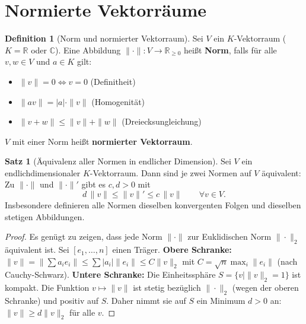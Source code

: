 ﻿\documentclass[a4paper,12pt]{report}
\theoremstyle{definition}
\newtheorem{definition}{Definition}
\newtheorem{satz}{Satz}
\begin{document}
\section{Normierte Vektorräume}

\begin{definition}[Norm und normierter Vektorraum]
    Sei $V$ ein $K$-Vektorraum ($K = \mathbb{R}$ oder $\mathbb{C}$).
    Eine Abbildung $\|\cdot\| : V \to \mathbb{R}_{\geq 0}$ heißt
    \textbf{Norm}, falls für alle $v, w \in V$ und $a \in K$ gilt:
    \begin{itemize}
        \item[-] $\|v\| = 0 \Leftrightarrow v = 0$ \quad (Definitheit)
        \item[-] $\|av\| = |a| \cdot \|v\|$ \quad (Homogenität)
        \item[-] $\|v + w\| \leq \|v\| + \|w\|$ \quad (Dreiecksungleichung)
    \end{itemize}
    $V$ mit einer Norm heißt \textbf{normierter Vektorraum}.
\end{definition}

\begin{satz}[Äquivalenz aller Normen in endlicher Dimension]
    Sei $V$ ein endlichdimensionaler $K$-Vektorraum. Dann sind je zwei
    Normen auf $V$ äquivalent: Zu $\|\cdot\|$ und $\|\cdot\|'$
    gibt es $c, d > 0$ mit
    \[
        d\, \|v\| \leq \|v\|' \leq c\, \|v\| \qquad \forall v \in V.
    \]
    Insbesondere definieren alle Normen dieselben konvergenten Folgen
    und dieselben stetigen Abbildungen.
\end{satz}
\begin{proof}
    Es genügt zu zeigen, dass jede Norm $\|\cdot\|$ zur Euklidischen Norm
    $\|\cdot\|_2$ äquivalent ist. Sei $[e_1, \ldots, n]$ einen Träger.
    \textbf{Obere Schranke:} $\|v\| = \|\sum a_i e_i\| \leq \sum |a_i| \|e_i\|
    \leq C \|v\|_2$ mit $C = \sqrt{n} \max_i \|e_i\|$ (nach Cauchy-Schwarz).
    \textbf{Untere Schranke:} Die Einheitssphäre $S = \{v \mid \|v\|_2 = 1\}$
    ist kompakt. Die Funktion $v \mapsto \|v\|$ ist stetig bezüglich $\|\cdot\|_2$
    (wegen der oberen Schranke) und positiv auf $S$. Daher nimmt sie auf $S$
    ein Minimum $d > 0$ an: $\|v\| \geq d \|v\|_2$ für alle $v$.
\end{proof}
\end{document}
